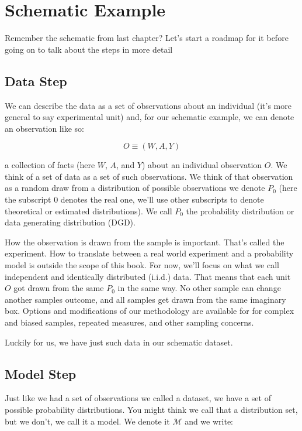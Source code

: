 \documentclass[
  12pt, krantz2,
]{krantz}
\theoremstyle{definition}
\theoremstyle{definition}
\theoremstyle{definition}
\newcommand{\1}{\mathbbm{1}}
\begin{document}
\hypertarget{schematic-example}{%
\section{Schematic Example}\label{schematic-example}}

Remember the schematic from last chapter? Let's start a roadmap for it before going on to talk about the steps in more detail

\hypertarget{data-step}{%
\subsection{Data Step}\label{data-step}}

We can describe the data as a set of observations about an individual (it's more general to say experimental unit) and, for our schematic example, we can denote an observation like so:

\[O \equiv (W,A,Y)\]

a collection of facts (here \(W\), \(A\), and \(Y\)) about an individual observation \(O\). We think of a set of data as a set of such observations. We think of that observation as a random draw from a distribution of possible observations we denote \(P_0\) (here the subscript \(0\) denotes the real one, we'll use other subscripts to denote theoretical or estimated distributions). We call \(P_0\) the probability distribution or data generating distribution (DGD).

How the observation is drawn from the sample is important. That's called the experiment. How to translate between a real world experiment and a probability model is outside the scope of this book. For now, we'll focus on what we call independent and identically distributed (i.i.d.) data. That means that each unit \(O\) got drawn from the same \(P_0\) in the same way. No other sample can change another samples outcome, and all samples get drawn from the same imaginary box. Options and modifications of our methodology are available for for complex and biased samples, repeated measures, and other sampling concerns.

Luckily for us, we have just such data in our schematic dataset.

\hypertarget{model-step}{%
\subsection{Model Step}\label{model-step}}

Just like we had a set of observations we called a dataset, we have a set of possible probability distributions. You might think we call that a distribution set, but we don't, we call it a model. We denote it \(\mathcal{M}\) and we write:
\end{document}
